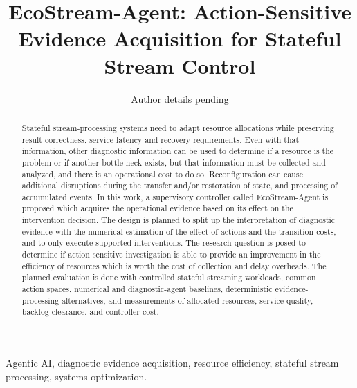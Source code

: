 \documentclass[journal]{IEEEtran}
\begin{document}
\title{EcoStream-Agent: Action-Sensitive Evidence Acquisition for Stateful Stream Control}

\author{Author details pending}


\maketitle

\begin{abstract}
Stateful stream-processing systems need to adapt resource allocations while preserving result correctness, service latency and recovery requirements. Even with that information, other diagnostic information can be used to determine if a resource is the problem or if another bottle neck exists, but that information must be collected and analyzed, and there is an operational cost to do so. Reconfiguration can cause additional disruptions during the transfer and/or restoration of state, and processing of accumulated events. In this work, a supervisory controller called EcoStream-Agent is proposed which acquires the operational evidence based on its effect on the intervention decision. The design is planned to split up the interpretation of diagnostic evidence with the numerical estimation of the effect of actions and the transition costs, and to only execute supported interventions. The research question is posed to determine if action sensitive investigation is able to provide an improvement in the efficiency of resources which is worth the cost of collection and delay overheads. The planned evaluation is done with controlled stateful streaming workloads, common action spaces, numerical and diagnostic-agent baselines, deterministic evidence-processing alternatives, and measurements of allocated resources, service quality, backlog clearance, and controller cost.
\end{abstract}

\begin{IEEEkeywords}
Agentic AI, diagnostic evidence acquisition, resource efficiency, stateful stream processing, systems optimization.
\end{IEEEkeywords}
\end{document}
